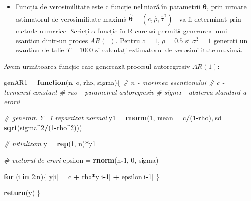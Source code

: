 \documentclass[]{article}
\newenvironment{Shaded}{\begin{snugshade}}{\end{snugshade}}
\newcommand{\KeywordTok}[1]{\textcolor[rgb]{0.13,0.29,0.53}{\textbf{#1}}}
\newcommand{\DataTypeTok}[1]{\textcolor[rgb]{0.13,0.29,0.53}{#1}}
\newcommand{\DecValTok}[1]{\textcolor[rgb]{0.00,0.00,0.81}{#1}}
\newcommand{\StringTok}[1]{\textcolor[rgb]{0.31,0.60,0.02}{#1}}
\newcommand{\CommentTok}[1]{\textcolor[rgb]{0.56,0.35,0.01}{\textit{#1}}}
\newcommand{\ControlFlowTok}[1]{\textcolor[rgb]{0.13,0.29,0.53}{\textbf{#1}}}
\newcommand{\OperatorTok}[1]{\textcolor[rgb]{0.81,0.36,0.00}{\textbf{#1}}}
\newcommand{\NormalTok}[1]{#1}
\newenvironment{frshaded*}{%
  \def\FrameCommand{\fboxrule=\FrameRule\fboxsep=\FrameSep \fcolorbox{framecolor}{shadecolor1}}%
  \MakeFramed {\advance\hsize-\width \FrameRestore}}%
{\endMakeFramed}
\newenvironment{rmdblock}[1]
  {\begin{frshaded*}
  \begin{itemize}
  \renewcommand{\labelitemi}{
    \raisebox{-.7\height}[0pt][0pt]{
      {\setkeys{Gin}{width=2em,keepaspectratio}\texttt{[image: images/icons/\#1]}}
    }
  }
  \item
  }
  {
  \end{itemize}
  \end{frshaded*}
  }
\newenvironment{rmdexercise}
  {\begin{rmdblock}{exercise}}
  {\end{rmdblock}}
\begin{document}
\begin{rmdexercise}
Funcția de verosimilitate este o funcție neliniară în parametrii
\(\mathbf{\theta}\), prin urmare estimatorul de verosimilitate maximă
\(\hat{\mathbf{\theta}} = (\hat{c}, \hat{\rho}, \hat{\sigma}^2)^\intercal\)
va fi determinat prin metode numerice. Scrieți o funcție în R care să
permită generarea unui eșantion dintr-un proces \(AR(1)\). Pentru
\(c = 1\), \(\rho = 0.5\) și \(\sigma^2 = 1\) generați un eșantion de
talie \(T = 1000\) și calculați estimatorul de verosimilitate maximă.
\end{rmdexercise}

Avem următoarea funcție care generează procesul autoregresiv \(AR(1)\):

\begin{Shaded}
\begin{Highlighting}[]
\NormalTok{genAR1 =}\StringTok{ }\ControlFlowTok{function}\NormalTok{(n, c, rho, sigma)\{}
  \CommentTok{# n - marimea esantionului}
  \CommentTok{# c - termenul constant}
  \CommentTok{# rho - parametrul autoregresiv}
  \CommentTok{# sigma - abaterea standard a erorii}
  
  \CommentTok{# generam Y_1 repartizat normal}
\NormalTok{  y1 =}\StringTok{ }\KeywordTok{rnorm}\NormalTok{(}\DecValTok{1}\NormalTok{, }\DataTypeTok{mean =}\NormalTok{ c}\OperatorTok{/}\NormalTok{(}\DecValTok{1}\OperatorTok{-}\NormalTok{rho), }\DataTypeTok{sd =} \KeywordTok{sqrt}\NormalTok{(sigma}\OperatorTok{^}\DecValTok{2}\OperatorTok{/}\NormalTok{(}\DecValTok{1}\OperatorTok{-}\NormalTok{rho}\OperatorTok{^}\DecValTok{2}\NormalTok{)))}
  
  \CommentTok{# nitializam}
\NormalTok{  y =}\StringTok{ }\KeywordTok{rep}\NormalTok{(}\DecValTok{1}\NormalTok{, n)}\OperatorTok{*}\NormalTok{y1}
  
  \CommentTok{# vectorul de erori}
\NormalTok{  epsilon =}\StringTok{ }\KeywordTok{rnorm}\NormalTok{(n}\OperatorTok{-}\DecValTok{1}\NormalTok{, }\DecValTok{0}\NormalTok{, sigma)}
  
  \ControlFlowTok{for}\NormalTok{ (i }\ControlFlowTok{in} \DecValTok{2}\OperatorTok{:}\NormalTok{n)\{}
\NormalTok{    y[i] =}\StringTok{ }\NormalTok{c }\OperatorTok{+}\StringTok{ }\NormalTok{rho}\OperatorTok{*}\NormalTok{y[i}\OperatorTok{-}\DecValTok{1}\NormalTok{] }\OperatorTok{+}\StringTok{ }\NormalTok{epsilon[i}\OperatorTok{-}\DecValTok{1}\NormalTok{]}
\NormalTok{  \}}
  
  \KeywordTok{return}\NormalTok{(y)}
\NormalTok{\}}
\end{Highlighting}
\end{Shaded}
\end{document}
